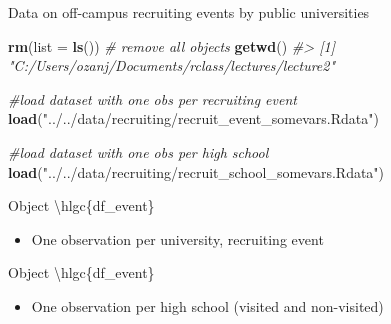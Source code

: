\documentclass[8pt,ignorenonframetext,]{beamer}
\newenvironment{Shaded}{\begin{snugshade}}{\end{snugshade}}
\newcommand{\KeywordTok}[1]{\textcolor[rgb]{0.13,0.29,0.53}{\textbf{#1}}}
\newcommand{\DataTypeTok}[1]{\textcolor[rgb]{0.13,0.29,0.53}{#1}}
\newcommand{\StringTok}[1]{\textcolor[rgb]{0.31,0.60,0.02}{#1}}
\newcommand{\CommentTok}[1]{\textcolor[rgb]{0.56,0.35,0.01}{\textit{#1}}}
\newcommand{\NormalTok}[1]{#1}
\providecommand{\tightlist}{%
  \setlength{\itemsep}{0pt}\setlength{\parskip}{0pt}}
\begin{document}
\begin{frame}[fragile]{Data on off-campus recruiting events by public
universities}

\begin{Shaded}
\begin{Highlighting}[]
\KeywordTok{rm}\NormalTok{(}\DataTypeTok{list =} \KeywordTok{ls}\NormalTok{()) }\CommentTok{# remove all objects}
\KeywordTok{getwd}\NormalTok{()}
\CommentTok{#> [1] "C:/Users/ozanj/Documents/rclass/lectures/lecture2"}

\CommentTok{#load dataset with one obs per recruiting event}
\KeywordTok{load}\NormalTok{(}\StringTok{"../../data/recruiting/recruit_event_somevars.Rdata"}\NormalTok{)}

\CommentTok{#load dataset with one obs per high school}
\KeywordTok{load}\NormalTok{(}\StringTok{"../../data/recruiting/recruit_school_somevars.Rdata"}\NormalTok{)}
\end{Highlighting}
\end{Shaded}

Object \textbackslash{}hlgc\{df\_event\}

\begin{itemize}
\tightlist
\item
  One observation per university, recruiting event
\end{itemize}

Object \textbackslash{}hlgc\{df\_event\}

\begin{itemize}
\tightlist
\item
  One observation per high school (visited and non-visited)
\end{itemize}

\end{frame}
\end{document}

